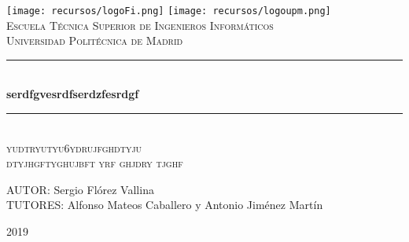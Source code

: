 \documentclass[spanish,12pt, a4paper,twoside]{paper}
\begin{document}
    \begin{titlepage}

        \newcommand{\HRule}{\rule{\linewidth}{0.5mm}} %

        \center %

        \texttt{[image: recursos/logoFi.png]}
        \hspace{8cm}
        \texttt{[image: recursos/logoupm.png]}
        \\[1cm]

        \textsc{\Large Escuela Técnica Superior de Ingenieros Informáticos}\\[0.5cm]
        \textsc{\large Universidad Politécnica de Madrid}
        \\[3cm]


        \HRule \\[0.4cm]
        { \huge \bfseries serdfgvesrdfserdzfesrdgf}\\[0.4cm] %
        \HRule \\[2.5cm]

        \textsc{\LARGE yudtryutyu6ydrujfghdtyju}\\[0.5cm]
        \textsc{\Large dtyjhgftyghujbft yrf ghjdry tjghf }\\[2.5cm]

        \begin{flushright}
            \large
            AUTOR: Sergio Flórez Vallina\\
            TUTORES: Alfonso Mateos Caballero y \linebreak
            Antonio Jiménez Martín
        \end{flushright}

        \vspace{1.3cm}

        { {2019}}\\[3cm]

        \vfill

    \end{titlepage}
\end{document}
